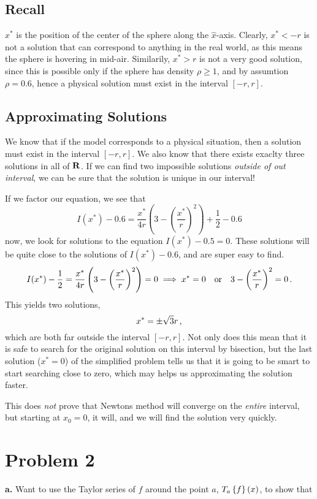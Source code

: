 \documentclass[12pt]{article}
\newcommand{\subtask}[1]{{\bf #1.}}
\begin{document}
\subsection*{Recall}
$x^*$ is the position of the center of the sphere along the $\hat x$-axis.
Clearly, $x^* < -r$ is not a solution that can correspond to anything in
the real world, as this means the sphere is hovering in mid-air.
Similarily, $x^* > r$ is not a very good solution, since this is possible
only if the sphere has density $\rho \geq 1$, and by assumtion $\rho = 0.6$,
hence a physical solution must exist in the interval $[-r, r]$.

\subsection*{Approximating Solutions}
We know that if the model corresponds to a physical situation,
then a solution must exist in the interval $[-r, r]$.
We also know that there exists exaclty three solutions in all of $\R$.
If we can find two impossible solutions {\em outside of out interval},
we can be sure that the solution is unique in our interval!

If we factor our equation, we see that
\[
    I(x^*) - 0.6 = \frac{x^*}{4r} \left(
    3 - \left(\frac{x^*}{r}\right)^2
    \right) + \frac{1}{2} - 0.6
\]
now, we look for solutions to the equation $I(x^*) - 0.5 = 0$.
These solutions will be quite close to the solutions of $I(x^*) - 0.6$,
and are super easy to find.
\[
    I(x^*) - \frac{1}{2} = \frac{x^*}{4r} \left(
    3 - \left(\frac{x^*}{r}\right)^2
    \right) = 0
    \implies x^* = 0 \quad\text{or}\quad 3 - \left(\frac{x^*}{r}\right)^2 = 0 \,\text.
\]
This yields two solutions,
\[
    x^* = \pm \sqrt{3}r \,\text,
\]
which are both far outside the interval $[-r, r]$.
Not only does this mean that it is safe to search for the original solution
on this interval by bisection, but the last solution ($x^* = 0$) of the simplified problem
tells us that it is going to be smart to start searching close to zero,
which may helps us approximating the solution faster.

This does {\em not} prove that Newtons method will converge on the {\em entire} interval,
but starting at $x_0 = 0$, it will, and we will find the solution very quickly.




\section*{Problem 2}
\subtask{a} Want to use the Taylor series of $f$ around the point $a$,
$\Tay{f}{a}{x}$, to show that
\end{document}
